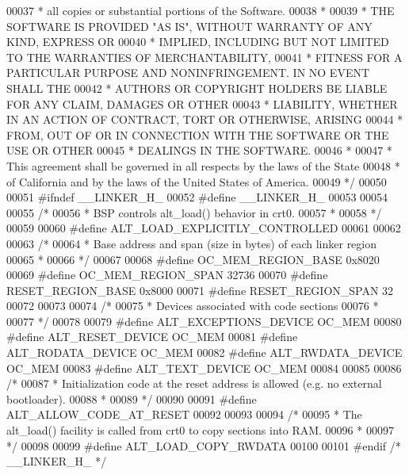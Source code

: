 \begin{DoxyCode}
00037 \textcolor{comment}{ * all copies or substantial portions of the Software.}
00038 \textcolor{comment}{ *}
00039 \textcolor{comment}{ * THE SOFTWARE IS PROVIDED "AS IS", WITHOUT WARRANTY OF ANY KIND, EXPRESS OR}
00040 \textcolor{comment}{ * IMPLIED, INCLUDING BUT NOT LIMITED TO THE WARRANTIES OF MERCHANTABILITY,}
00041 \textcolor{comment}{ * FITNESS FOR A PARTICULAR PURPOSE AND NONINFRINGEMENT. IN NO EVENT SHALL THE}
00042 \textcolor{comment}{ * AUTHORS OR COPYRIGHT HOLDERS BE LIABLE FOR ANY CLAIM, DAMAGES OR OTHER}
00043 \textcolor{comment}{ * LIABILITY, WHETHER IN AN ACTION OF CONTRACT, TORT OR OTHERWISE, ARISING}
00044 \textcolor{comment}{ * FROM, OUT OF OR IN CONNECTION WITH THE SOFTWARE OR THE USE OR OTHER}
00045 \textcolor{comment}{ * DEALINGS IN THE SOFTWARE.}
00046 \textcolor{comment}{ *}
00047 \textcolor{comment}{ * This agreement shall be governed in all respects by the laws of the State}
00048 \textcolor{comment}{ * of California and by the laws of the United States of America.}
00049 \textcolor{comment}{ */}
00050 
00051 \textcolor{preprocessor}{#ifndef \_\_LINKER\_H\_}
00052 \textcolor{preprocessor}{#define \_\_LINKER\_H\_}
00053 
00054 
00055 \textcolor{comment}{/*}
00056 \textcolor{comment}{ * BSP controls alt\_load() behavior in crt0.}
00057 \textcolor{comment}{ *}
00058 \textcolor{comment}{ */}
00059 
00060 \textcolor{preprocessor}{#define ALT\_LOAD\_EXPLICITLY\_CONTROLLED}
00061 
00062 
00063 \textcolor{comment}{/*}
00064 \textcolor{comment}{ * Base address and span (size in bytes) of each linker region}
00065 \textcolor{comment}{ *}
00066 \textcolor{comment}{ */}
00067 
00068 \textcolor{preprocessor}{#define OC\_MEM\_REGION\_BASE 0x8020}
00069 \textcolor{preprocessor}{#define OC\_MEM\_REGION\_SPAN 32736}
00070 \textcolor{preprocessor}{#define RESET\_REGION\_BASE 0x8000}
00071 \textcolor{preprocessor}{#define RESET\_REGION\_SPAN 32}
00072 
00073 
00074 \textcolor{comment}{/*}
00075 \textcolor{comment}{ * Devices associated with code sections}
00076 \textcolor{comment}{ *}
00077 \textcolor{comment}{ */}
00078 
00079 \textcolor{preprocessor}{#define ALT\_EXCEPTIONS\_DEVICE OC\_MEM}
00080 \textcolor{preprocessor}{#define ALT\_RESET\_DEVICE OC\_MEM}
00081 \textcolor{preprocessor}{#define ALT\_RODATA\_DEVICE OC\_MEM}
00082 \textcolor{preprocessor}{#define ALT\_RWDATA\_DEVICE OC\_MEM}
00083 \textcolor{preprocessor}{#define ALT\_TEXT\_DEVICE OC\_MEM}
00084 
00085 
00086 \textcolor{comment}{/*}
00087 \textcolor{comment}{ * Initialization code at the reset address is allowed (e.g. no external bootloader).}
00088 \textcolor{comment}{ *}
00089 \textcolor{comment}{ */}
00090 
00091 \textcolor{preprocessor}{#define ALT\_ALLOW\_CODE\_AT\_RESET}
00092 
00093 
00094 \textcolor{comment}{/*}
00095 \textcolor{comment}{ * The alt\_load() facility is called from crt0 to copy sections into RAM.}
00096 \textcolor{comment}{ *}
00097 \textcolor{comment}{ */}
00098 
00099 \textcolor{preprocessor}{#define ALT\_LOAD\_COPY\_RWDATA}
00100 
00101 \textcolor{preprocessor}{#endif }\textcolor{comment}{/* \_\_LINKER\_H\_ */}\textcolor{preprocessor}{}
\end{DoxyCode}

